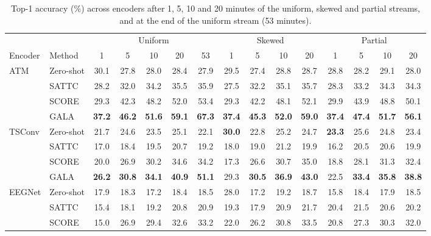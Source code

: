 \documentclass[10pt,twocolumn,letterpaper]{article}
\begin{document}
\begin{table}[p]
\caption{Top-1 accuracy (\%) across encoders after 1, 5, 10 and 20 minutes of the uniform, skewed and partial streams, and at the end of the uniform stream (53 minutes).}
\label{tab:encoders}
\centering
\small
\setlength{\tabcolsep}{4.5pt}
\begin{tabular}{@{}llccccccccccccc@{}}
\toprule
 & & \multicolumn{5}{c}{Uniform} & \multicolumn{4}{c}{Skewed} & \multicolumn{4}{c}{Partial} \\
\cmidrule(lr){3-7}\cmidrule(lr){8-11}\cmidrule(lr){12-15}
Encoder & Method & 1 & 5 & 10 & 20 & 53 & 1 & 5 & 10 & 20 & 1 & 5 & 10 & 20 \\
\midrule
\multirow{4}{*}{ATM} & Zero-shot & 30.1 & 27.8 & 28.0 & 28.4 & 27.9 & 29.5 & 27.4 & 28.8 & 28.7 & 28.8 & 28.2 & 29.1 & 28.0 \\
 & SATTC & 28.2 & 32.0 & 34.2 & 35.5 & 35.9 & 27.5 & 32.2 & 35.1 & 35.7 & 28.3 & 33.2 & 34.3 & 34.3 \\
 & SCORE & 29.3 & 42.3 & 48.2 & 52.0 & 53.4 & 29.3 & 42.2 & 48.1 & 52.1 & 29.9 & 43.9 & 48.8 & 50.1 \\
 & GALA & \textbf{37.2} & \textbf{46.2} & \textbf{51.6} & \textbf{59.1} & \textbf{67.3} & \textbf{37.4} & \textbf{45.3} & \textbf{52.0} & \textbf{59.0} & \textbf{37.4} & \textbf{47.4} & \textbf{51.7} & \textbf{56.1} \\
\midrule
\multirow{4}{*}{TSConv} & Zero-shot & 21.7 & 24.6 & 23.5 & 25.1 & 22.1 & \textbf{30.0} & 22.8 & 25.2 & 24.7 & \textbf{23.3} & 25.6 & 24.8 & 23.4 \\
 & SATTC & 17.0 & 18.4 & 19.5 & 20.7 & 19.2 & 18.0 & 19.0 & 21.2 & 19.9 & 16.2 & 20.5 & 20.6 & 19.9 \\
 & SCORE & 20.0 & 26.9 & 30.2 & 34.6 & 34.2 & 17.3 & 26.6 & 30.7 & 35.0 & 18.8 & 28.1 & 31.3 & 32.4 \\
 & GALA & \textbf{26.2} & \textbf{30.8} & \textbf{34.1} & \textbf{40.9} & \textbf{51.1} & 29.3 & \textbf{30.5} & \textbf{36.9} & \textbf{43.0} & 22.5 & \textbf{33.4} & \textbf{35.8} & \textbf{38.8} \\
\midrule
\multirow{4}{*}{EEGNet} & Zero-shot & 17.9 & 18.3 & 17.2 & 18.4 & 18.5 & 28.0 & 17.2 & 19.2 & 18.7 & 15.8 & 18.4 & 17.9 & 18.5 \\
 & SATTC & 15.4 & 18.1 & 19.2 & 20.8 & 20.9 & 19.3 & 17.9 & 20.9 & 21.7 & 20.4 & 21.5 & 20.6 & 20.2 \\
 & SCORE & 15.0 & 26.9 & 29.4 & 32.6 & 33.2 & 22.0 & 26.2 & 30.8 & 33.5 & 20.8 & 27.3 & 30.3 & 32.0 \\

\end{tabular}
\end{table}
\end{document}

